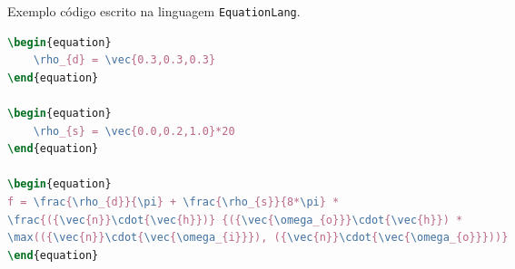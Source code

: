 \begin{codigo}[htb]
        \caption{\small Exemplo código escrito na linguagem \texttt{EquationLang}. }
        \label{code-gramatica}
\begin{lstlisting}[language=tex, frame=none]
\begin{equation}
    \rho_{d} = \vec{0.3,0.3,0.3}
\end{equation}

\begin{equation}
    \rho_{s} = \vec{0.0,0.2,1.0}*20
\end{equation}

\begin{equation}
f = \frac{\rho_{d}}{\pi} + \frac{\rho_{s}}{8*\pi} *
\frac{({\vec{n}}\cdot{\vec{h}})} {({\vec{\omega_{o}}}\cdot{\vec{h}}) *
\max(({\vec{n}}\cdot{\vec{\omega_{i}}}), ({\vec{n}}\cdot{\vec{\omega_{o}}}))}
\end{equation}

\end{lstlisting}
\end{codigo}

